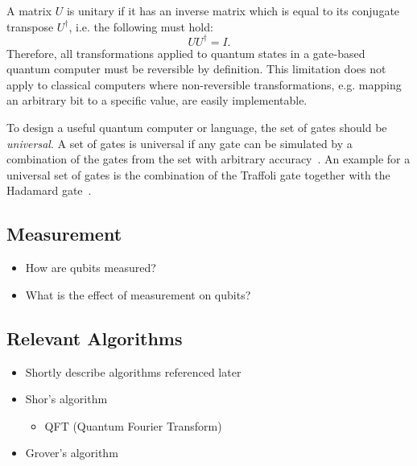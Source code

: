 A matrix $U$ is unitary if it has an inverse matrix which is equal to its conjugate transpose $U^\dagger$, i.e. the following must hold:
\begin{equation*}
    U U^\dagger = I.
\end{equation*}
Therefore, all transformations applied to quantum states in a gate-based quantum computer must be reversible by definition. This limitation does not apply to classical computers where non-reversible transformations, e.g. mapping an arbitrary bit to a specific value, are easily implementable. 

To design a useful quantum computer or language, the set of gates should be \emph{universal}. A set of gates is universal if any gate can be simulated by a combination of the gates from the set with arbitrary accuracy~\cite{BrBr01}. An example for a universal set of gates is the combination of the Traffoli gate together with the Hadamard gate~\cite{DiCh20}.

\subsection{Measurement}
\begin{itemize}
    \item How are qubits measured?
    \item What is the effect of measurement on qubits?
\end{itemize}

\subsection{Relevant Algorithms}
\begin{itemize}
    \item Shortly describe algorithms referenced later
    \item Shor's algorithm %
    \begin{itemize}
        \item QFT (Quantum Fourier Transform) 
    \end{itemize} 
    \item Grover's algorithm %
\end{itemize}